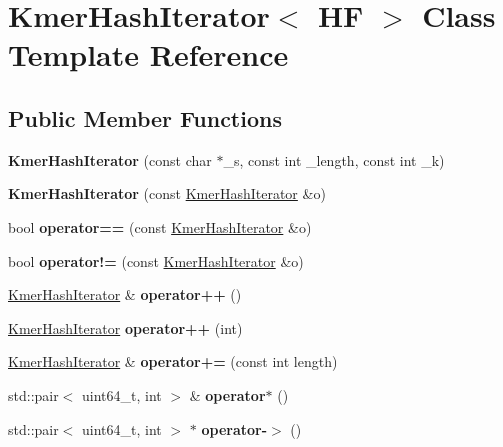 \hypertarget{classKmerHashIterator}{}\section{Kmer\+Hash\+Iterator$<$ HF $>$ Class Template Reference}
\label{classKmerHashIterator}
\subsection*{Public Member Functions}
\begin{DoxyCompactItemize}
\item 
\mbox{\label{classKmerHashIterator_a929adb014a69b8e4d752ad0e47b65ca9}} 
{\bfseries Kmer\+Hash\+Iterator} (const char $\ast$\+\_\+s, const int \+\_\+length, const int \+\_\+k)
\item 
\mbox{\label{classKmerHashIterator_aa397e51df22e34f1aa89ed92102dbaf2}} 
{\bfseries Kmer\+Hash\+Iterator} (const \hyperlink{classKmerHashIterator}{Kmer\+Hash\+Iterator} \&o)
\item 
\mbox{\label{classKmerHashIterator_a55230c6e2dc6d3fe7c4c51b7c1df0cdb}} 
bool {\bfseries operator==} (const \hyperlink{classKmerHashIterator}{Kmer\+Hash\+Iterator} \&o)
\item 
\mbox{\label{classKmerHashIterator_a6fd32bb238a25dc4f08dced85cf4151b}} 
bool {\bfseries operator!=} (const \hyperlink{classKmerHashIterator}{Kmer\+Hash\+Iterator} \&o)
\item 
\mbox{\label{classKmerHashIterator_aa33fc103295479466e86d45815fd578c}} 
\hyperlink{classKmerHashIterator}{Kmer\+Hash\+Iterator} \& {\bfseries operator++} ()
\item 
\mbox{\label{classKmerHashIterator_a98918cc97612e8c6049183fdc0814f04}} 
\hyperlink{classKmerHashIterator}{Kmer\+Hash\+Iterator} {\bfseries operator++} (int)
\item 
\mbox{\label{classKmerHashIterator_a348b4614e99608ba5e4c842c07a5e2d8}} 
\hyperlink{classKmerHashIterator}{Kmer\+Hash\+Iterator} \& {\bfseries operator+=} (const int length)
\item 
\mbox{\label{classKmerHashIterator_a17e42a16f9480a2e9326ff2f91fa39ad}} 
std\+::pair$<$ uint64\+\_\+t, int $>$ \& {\bfseries operator$\ast$} ()
\item 
\mbox{\label{classKmerHashIterator_a945e314bf18f59775adba443c9e5ed50}} 
std\+::pair$<$ uint64\+\_\+t, int $>$ $\ast$ {\bfseries operator-\/$>$} ()
\end{DoxyCompactItemize}
